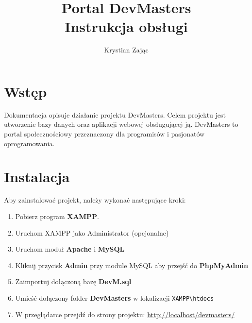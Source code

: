 \documentclass[a4paper,12pt]{article}
\title{Portal DevMasters \\ \large{Instrukcja obsługi}}
\author{Krystian Zając}
\date{}
\begin{document}
\maketitle
\tableofcontents
\newpage

\section{Wstęp}
Dokumentacja opisuje działanie projektu DevMasters. Celem projektu jest utworzenie bazy danych oraz aplikacji webowej obsługującej ją. DevMasters to portal społecznościowy przeznaczony dla programisów i pasjonatów oprogramowania.

\section{Instalacja}
Aby zainstalować projekt, należy wykonać następujące kroki:

\begin{enumerate}
  \item Pobierz program \textbf{XAMPP}.
  \item Uruchom XAMPP jako Administrator (opcjonalne)
  \item Uruchom moduł \textbf{Apache} i \textbf{MySQL}
  \item Kliknij przycisk \textbf{Admin} przy module MySQL aby przejść do \textbf{PhpMyAdmin}
  \item Zaimportuj dołączoną bazę \textbf{DevM.sql}
  \item Umieść dołączony folder \textbf{DevMasters} w lokalizacji \texttt{XAMPP\textbackslash{}htdocs}
  \item W przeglądarce przejdź do strony projektu: \url{http://localhost/devmasters/}
\end{enumerate}

\newpage
\end{document}
